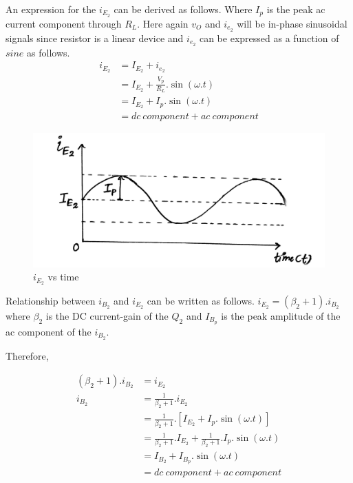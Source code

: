 \documentclass[a4paper,11pt]{article}%
\begin{document}
An expression for the $i_{E_2}$ can be derived as follows. Where $I_p$ is the peak ac current component through $R_L$. Here again $v_O$ and $i_{e_2}$ will be in-phase sinusoidal signals since resistor is a linear device and $i_{e_2}$ can be expressed as a function of $sine$ as follows.
\[
\begin{split}
	i_{E_2} &= I_{E_2} + i_{e_2}\\
	&= I_{E_2} + \frac{V_p}{R_L}.\sin(\omega.t)\\
	& = I_{E_2} + I_p.\sin(\omega.t)\\
	&= dc~component + ac~component
\end{split}
\]

\begin{figure}[!h]
	\centering
	\includegraphics[scale=0.11]{figures/modiE2}
	\caption{$i_{E_2}$ vs time}
\end{figure}

\pagebreak
Relationship between $i_{B_2}$ and $i_{E_2}$ can be written as follows.
$i_{E_2} = \left( \beta_2 +1 \right).i_{B_2}$ where $\beta_2$ is the DC current-gain of the $Q_2$ and $I_{B_p}$ is the peak amplitude of the ac component of the $i_{B_2}$. 

Therefore,

\[
\begin{split}
\left( \beta_2 +1 \right).i_{B_2} & = 	i_{E_2}\\
i_{B_2} & = \frac{1}{\beta_2+1}.i_{E_2}\\
& = \frac{1}{\beta_2+1}.\left[ I_{E_2} + I_p.\sin(\omega.t) \right]\\
& = \frac{1}{\beta_2+1}.I_{E_2} + \frac{1}{\beta_2+1}.I_p.\sin(\omega.t)\\
& = I_{B_2} + I_{B_p}.\sin(\omega.t)\\
&= dc~component + ac~component
\end{split}
\]  
\end{document}
